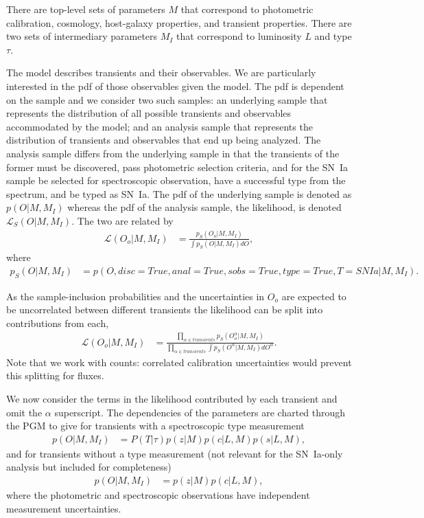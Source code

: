 \documentclass[preprint,3p]{elsarticle}
\begin{document}
There are top-level  sets of parameters $M$ that correspond to photometric calibration, cosmology,
host-galaxy properties, and transient properties.
There are two sets of intermediary parameters $M_I$ that correspond to luminosity $L$ and type $\tau$.

The model describes transients and their observables.  We are particularly interested in the pdf of those observables
given the model.  The pdf is dependent on the sample and we consider two such samples: an underlying sample
that represents the distribution of all possible transients and observables accommodated by the model; and
an analysis sample that represents the distribution of transients and observables that end up being analyzed.
The analysis sample differs from the underlying sample in that the transients of the former 
must be discovered, pass photometric selection criteria, and for the SN~Ia sample be selected for spectroscopic
observation, have a successful type from the spectrum, and be typed as SN~Ia.
The pdf of the underlying sample is denoted as $p(O|M,M_I)$ whereas the pdf of the analysis sample, the likelihood,
is denoted $\mathcal{L}_S(O | M, M_I)$. 
The two are related by
\begin{align}
\mathcal{L}(O_o | M, M_I) & = \frac{p_S(O_o|M, M_I)}{\int  p_S(O|M, M_I)dO},
\label{likelihood:eqn}
\end{align}
where
\begin{align}
p_S(O|M, M_I) &= p(O, disc=True, anal=True, sobs=True, type=True, T=SNIa |M, M_I).
\end{align}

As the sample-inclusion probabilities and the uncertainties in $O_o$ are expected to be uncorrelated between different transients
 the likelihood can be split into contributions
from each,
\begin{align*}
\mathcal{L}(O_o | M, M_I) & = \frac{\prod_{\alpha \in transients} p_S(O_o^\alpha|M, M_I)}{\prod_{\alpha \in transients} \int  p_S(O^\alpha|M, M_I)dO^\alpha}.
\end{align*}
Note that we work with counts:  correlated calibration uncertainties would prevent this splitting for fluxes.


We now consider the terms in the likelihood contributed by each transient and omit the $\alpha$ superscript. 
The dependencies of the parameters are charted through the PGM to give for transients with a  spectroscopic type measurement
\begin{align*}
p(O| M, M_I) & = P(T |\tau) p(z | M) p(c | L, M) p (s|L, M),
\end{align*}
and for transients without a type measurement (not relevant for the SN~Ia-only analysis but included for completeness)
\begin{align*}
p(O| M, M_I) & = p(z | M) p(c | L, M),
\end{align*}
where the photometric and spectroscopic observations have independent measurement uncertainties.
\end{document}
